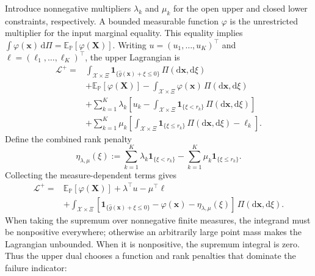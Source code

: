 Introduce nonnegative multipliers $\lambda_k$ and $\mu_k$ for the open upper and closed lower constraints, respectively. A bounded measurable function $\varphi$ is the unrestricted multiplier for the input marginal equality. This equality implies
$\int\varphi(\bm x)\,\mathrm d\Pi=\mathbb E_{\mathbb P}[\varphi(\bm X)]$.
Writing $u=(u_1,\ldots,u_K)^\top$ and $\ell=(\ell_1,\ldots,\ell_K)^\top$, the upper Lagrangian is \citep[Section~5.1]{B.V04}
\begin{equation}
  \begin{aligned}
    \mathcal L^+={}&
    \int_{\mathcal X\times\Xi}\mathbf1_{\{\hat g(\bm x)+\xi\le0\}}\,\Pi\left(\mathrm d\bm x,\mathrm d\xi\right)\\
    &+\mathbb E_{\mathbb P}\left[\varphi(\bm X)\right]
    -\int_{\mathcal X\times\Xi}\varphi(\bm x)\,\Pi\left(\mathrm d\bm x,\mathrm d\xi\right)\\
    &+\sum_{k=1}^K\lambda_k\left[u_k-\int_{\mathcal X\times\Xi}\mathbf1_{\{\xi<r_k\}}\,\Pi\left(\mathrm d\bm x,\mathrm d\xi\right)\right]\\
    &+\sum_{k=1}^K\mu_k\left[\int_{\mathcal X\times\Xi}\mathbf1_{\{\xi\le r_k\}}\,\Pi\left(\mathrm d\bm x,\mathrm d\xi\right)-\ell_k\right].
  \end{aligned}
  \label{eq-upper-lagrangian}
\end{equation}
Define the combined rank penalty
\begin{equation}
  \eta_{\lambda,\mu}(\xi):=
  \sum_{k=1}^K\lambda_k\mathbf1_{\{\xi<r_k\}}
  -\sum_{k=1}^K\mu_k\mathbf1_{\{\xi\le r_k\}}.
  \label{eq-dual-step-function}
\end{equation}
Collecting the measure-dependent terms gives
\begin{equation}
  \begin{aligned}
    \mathcal L^+={}&\mathbb E_{\mathbb P}\left[\varphi(\bm X)\right]+\lambda^\top u-\mu^\top\ell\\
    &+\int_{\mathcal X\times\Xi}\left[\mathbf1_{\{\hat g(\bm x)+\xi\le0\}}-\varphi(\bm x)-\eta_{\lambda,\mu}(\xi)\right]\,\Pi\left(\mathrm d\bm x,\mathrm d\xi\right).
  \end{aligned}
  \label{eq-collected-upper-lagrangian}
\end{equation}
When taking the supremum over nonnegative finite measures, the integrand must be nonpositive everywhere; otherwise an arbitrarily large point mass makes the Lagrangian unbounded. When it is nonpositive, the supremum integral is zero. Thus the upper dual chooses a function and rank penalties that dominate the failure indicator:
